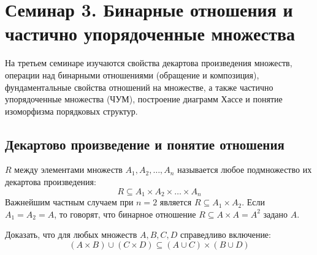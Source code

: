 \section{Семинар 3. Бинарные отношения и частично упорядоченные множества}

\begin{remark}
    На третьем семинаре изучаются свойства декартова произведения множеств, 
    операции над бинарными отношениями (обращение и композиция), 
    фундаментальные свойства отношений на множестве, а также частично 
    упорядоченные множества (ЧУМ), построение диаграмм Хассе и понятие 
    изоморфизма порядковых структур.
\end{remark}

\subsection{Декартово произведение и понятие отношения}

\begin{definition}
     $R$ между элементами 
    множеств $A_1, A_2, \dots, A_n$ называется любое подмножество их 
    декартова произведения:
    \[
        R \subseteq A_1 \times A_2 \times \dots \times A_n
    \]
    Важнейшим частным случаем при $n = 2$ является  $R \subseteq A_1 \times A_2$. Если $A_1 = A_2 = A$, то 
    говорят, что бинарное отношение $R \subseteq A \times A = A^2$ задано 
     $A$.
\end{definition}

\begin{problem}
    Доказать, что для любых множеств $A, B, C, D$ справедливо включение:
    \begin{equation} \label{eq:rel_inc_main}
        (A \times B) \cup (C \times D) \subseteq (A \cup C) \times (B \cup D) 
        \tag{1}
    \end{equation}
\end{problem}

